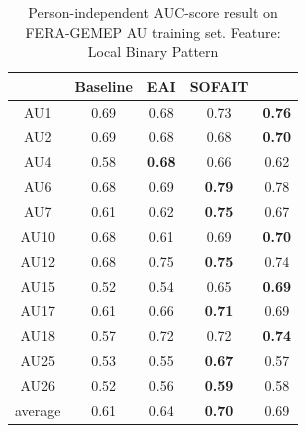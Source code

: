 \documentclass[10pt,journal]{IEEEtran}
\begin{document}
\begin{table}[htbp]
\caption{Person-independent AUC-score result on FERA-GEMEP AU training set. Feature: Local Binary Pattern}
\begin{center}
\label{table:fera_lbp}
\begin{tabular}{|c|cccc|}
\hline
& \pbox{10cm}{Baseline \\\cite{Valstar_FERA11}}	&\pbox{10cm}{EAI \\\cite{Yang_SMCB12}}	&\pbox{10cm}{SOFAIT \\\cite{Yang_FG13}}	&\pbox{10cm}{SOFIT}	\\ \hline
AU1		&0.69	&0.68	&0.73	&\textbf{0.76}\cellcolor[gray]{0.9}	\\ 
AU2		&0.69	&0.68	&0.68	&\textbf{0.70}\cellcolor[gray]{0.9}	\\
AU4		&0.58	&\textbf{0.68}\cellcolor[gray]{0.9}	&0.66	&0.62 \\
AU6		&0.68	&0.69	&\textbf{0.79}\cellcolor[gray]{0.9}	&0.78	\\
AU7		&0.61	&0.62	&\textbf{0.75}\cellcolor[gray]{0.9}	&0.67 \\
AU10	&0.68	&0.61	&0.69	&\textbf{0.70}\cellcolor[gray]{0.9} \\
AU12	&0.68	&0.75	&\textbf{0.75}\cellcolor[gray]{0.9}	&0.74 \\
AU15	&0.52	&0.54	&0.65	&\textbf{0.69}\cellcolor[gray]{0.9} \\
AU17	&0.61	&0.66	&\textbf{0.71}\cellcolor[gray]{0.9}	&0.69 \\
AU18	&0.57	&0.72	&0.72	&\textbf{0.74}\cellcolor[gray]{0.9} \\
AU25	&0.53	&0.55	&\textbf{0.67}\cellcolor[gray]{0.9}	&0.57 \\
AU26	&0.52	&0.56	&\textbf{0.59}\cellcolor[gray]{0.9}	&0.58 \\ \hline
average	&0.61	&0.64	&\textbf{0.70}\cellcolor[gray]{0.9}	&0.69 \\ \hline

\end{tabular}
\end{center}
\end{table}
\end{document}
